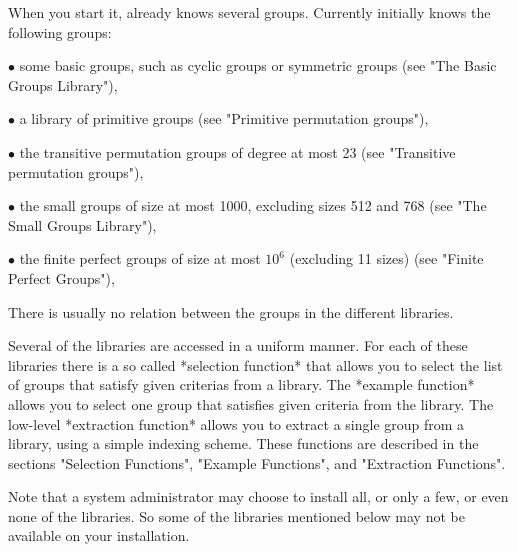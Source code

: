 
When you start it, {\GAP}  already knows several groups.  Currently {\GAP}
initially knows the  following groups:
{\parindent\manindent
\item{$\bullet$} some basic groups,  such as cyclic groups or symmetric
 groups (see "The Basic Groups Library"),
\item{$\bullet$} a library of primitive groups (see "Primitive permutation
groups"),
\item{$\bullet$} the transitive permutation groups  of degree  at most 23
  (see "Transitive permutation groups"),
\item{$\bullet$} the small groups of size at most 1000, excluding sizes 512
and 768 (see "The Small Groups Library"),
\item{$\bullet$} the  finite perfect groups  of size  at most  $10^6$
  (excluding 11 sizes) (see "Finite Perfect Groups"),
\par}

There is usually no relation between the groups in the different libraries.

Several of the libraries  are accessed in  a uniform manner.  For each of
these libraries there is a so called *selection function* that allows you
to select the list of groups that satisfy given criterias from a library.
The  *example  function* allows you to  select  one  group that satisfies
given   criteria from the library.   The  low-level *extraction function*
allows you  to extract a  single  group from a   library, using a  simple
indexing scheme. These functions are described in the sections "Selection
Functions", "Example Functions", and "Extraction Functions".

Note  that  a system administrator may  choose  to install  all, or  only
a few, or even none of the libraries.  So some of the libraries mentioned
below may not be available on your installation.

